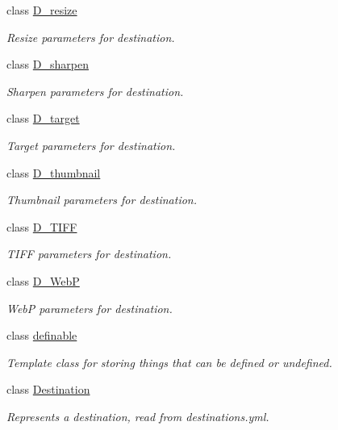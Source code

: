 \begin{DoxyCompactItemize}
class \hyperlink{class_photo_finish_1_1_d__resize}{D\+\_\+resize}
\begin{DoxyCompactList}\small\item\em Resize parameters for destination. \end{DoxyCompactList}\item 
class \hyperlink{class_photo_finish_1_1_d__sharpen}{D\+\_\+sharpen}
\begin{DoxyCompactList}\small\item\em Sharpen parameters for destination. \end{DoxyCompactList}\item 
class \hyperlink{class_photo_finish_1_1_d__target}{D\+\_\+target}
\begin{DoxyCompactList}\small\item\em Target parameters for destination. \end{DoxyCompactList}\item 
class \hyperlink{class_photo_finish_1_1_d__thumbnail}{D\+\_\+thumbnail}
\begin{DoxyCompactList}\small\item\em Thumbnail parameters for destination. \end{DoxyCompactList}\item 
class \hyperlink{class_photo_finish_1_1_d___t_i_f_f}{D\+\_\+\+T\+I\+FF}
\begin{DoxyCompactList}\small\item\em T\+I\+FF parameters for destination. \end{DoxyCompactList}\item 
class \hyperlink{class_photo_finish_1_1_d___web_p}{D\+\_\+\+WebP}
\begin{DoxyCompactList}\small\item\em WebP parameters for destination. \end{DoxyCompactList}\item 
class \hyperlink{class_photo_finish_1_1definable}{definable}
\begin{DoxyCompactList}\small\item\em Template class for storing things that can be defined or undefined. \end{DoxyCompactList}\item 
class \hyperlink{class_photo_finish_1_1_destination}{Destination}
\begin{DoxyCompactList}\small\item\em Represents a destination, read from destinations.\+yml. \end{DoxyCompactList}\item 

\end{DoxyCompactItemize}
